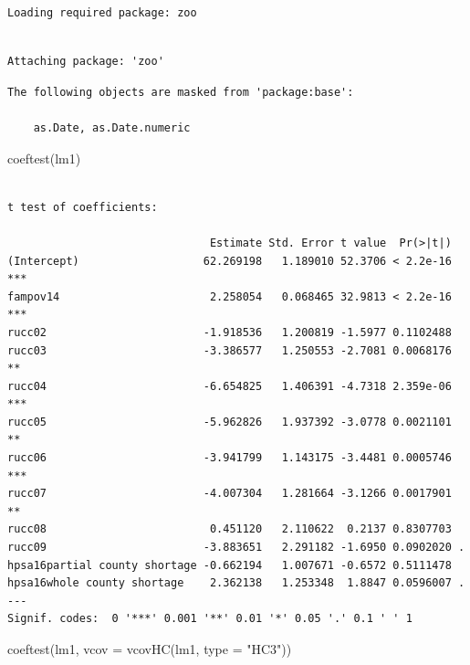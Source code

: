 \documentclass[
  letterpaper,
  DIV=11,
  numbers=noendperiod]{scrreprt}
\newenvironment{Shaded}{\begin{snugshade}}{\end{snugshade}}
\newcommand{\AttributeTok}[1]{\textcolor[rgb]{0.40,0.45,0.13}{#1}}
\newcommand{\FunctionTok}[1]{\textcolor[rgb]{0.28,0.35,0.67}{#1}}
\newcommand{\NormalTok}[1]{\textcolor[rgb]{0.00,0.23,0.31}{#1}}
\newcommand{\StringTok}[1]{\textcolor[rgb]{0.13,0.47,0.30}{#1}}
\begin{document}
\begin{verbatim}
Loading required package: zoo
\end{verbatim}

\begin{verbatim}

Attaching package: 'zoo'
\end{verbatim}

\begin{verbatim}
The following objects are masked from 'package:base':

    as.Date, as.Date.numeric
\end{verbatim}

\begin{Shaded}
\begin{Highlighting}[]
\FunctionTok{coeftest}\NormalTok{(lm1)}
\end{Highlighting}
\end{Shaded}

\begin{verbatim}

t test of coefficients:

                               Estimate Std. Error t value  Pr(>|t|)    
(Intercept)                   62.269198   1.189010 52.3706 < 2.2e-16 ***
fampov14                       2.258054   0.068465 32.9813 < 2.2e-16 ***
rucc02                        -1.918536   1.200819 -1.5977 0.1102488    
rucc03                        -3.386577   1.250553 -2.7081 0.0068176 ** 
rucc04                        -6.654825   1.406391 -4.7318 2.359e-06 ***
rucc05                        -5.962826   1.937392 -3.0778 0.0021101 ** 
rucc06                        -3.941799   1.143175 -3.4481 0.0005746 ***
rucc07                        -4.007304   1.281664 -3.1266 0.0017901 ** 
rucc08                         0.451120   2.110622  0.2137 0.8307703    
rucc09                        -3.883651   2.291182 -1.6950 0.0902020 .  
hpsa16partial county shortage -0.662194   1.007671 -0.6572 0.5111478    
hpsa16whole county shortage    2.362138   1.253348  1.8847 0.0596007 .  
---
Signif. codes:  0 '***' 0.001 '**' 0.01 '*' 0.05 '.' 0.1 ' ' 1
\end{verbatim}

\begin{Shaded}
\begin{Highlighting}[]
\FunctionTok{coeftest}\NormalTok{(lm1, }\AttributeTok{vcov  =} \FunctionTok{vcovHC}\NormalTok{(lm1, }\AttributeTok{type =} \StringTok{"HC3"}\NormalTok{))}
\end{Highlighting}
\end{Shaded}
\end{document}
